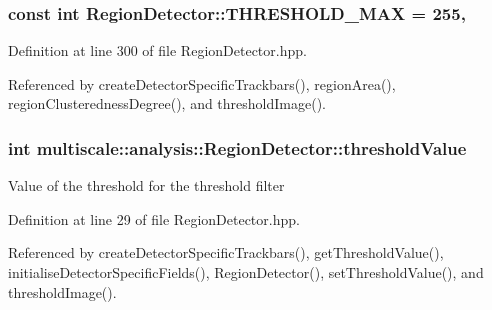 \hypertarget{classmultiscale_1_1analysis_1_1RegionDetector_a53c6e2b067a8b8c82484cbca34cc3d57}{
\subsubsection[{T\-H\-R\-E\-S\-H\-O\-L\-D\-\_\-\-M\-A\-X}]{\setlength{\rightskip}{0pt plus 5cm}const int Region\-Detector\-::\-T\-H\-R\-E\-S\-H\-O\-L\-D\-\_\-\-M\-A\-X = 255\hspace{0.3cm}{\ttfamily [static]}, {\ttfamily [private]}}}\label{classmultiscale_1_1analysis_1_1RegionDetector_a53c6e2b067a8b8c82484cbca34cc3d57}


Definition at line 300 of file Region\-Detector.\-hpp.



Referenced by create\-Detector\-Specific\-Trackbars(), region\-Area(), region\-Clusteredness\-Degree(), and threshold\-Image().

\hypertarget{classmultiscale_1_1analysis_1_1RegionDetector_a0f7469d124c0b906d199e00ea5713007}{
\subsubsection[{threshold\-Value}]{\setlength{\rightskip}{0pt plus 5cm}int multiscale\-::analysis\-::\-Region\-Detector\-::threshold\-Value\hspace{0.3cm}{\ttfamily [private]}}}\label{classmultiscale_1_1analysis_1_1RegionDetector_a0f7469d124c0b906d199e00ea5713007}
Value of the threshold for the threshold filter 

Definition at line 29 of file Region\-Detector.\-hpp.



Referenced by create\-Detector\-Specific\-Trackbars(), get\-Threshold\-Value(), initialise\-Detector\-Specific\-Fields(), Region\-Detector(), set\-Threshold\-Value(), and threshold\-Image().

